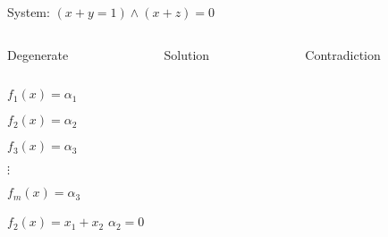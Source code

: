 \begin{frame}

    System: $(x + y = 1) \land (x + z) = 0$
	\begin{columns}
        \begin{column}{3cm}
            Degenerate
        \end{column}
        \begin{column}{3cm}
            Solution
    \end{column}
        \begin{column}{3cm}
            Contradiction
        \end{column}
    \end{columns}

    
    \begin{columns}
        \begin{column}{3cm}
            
        \end{column}
        \begin{column}{3cm}
            
        \end{column}
        \begin{column}{3cm}
            
        \end{column}
    \end{columns}

\end{frame}


\begin{frame}

    \begin{columns}
        \begin{column}{2.5cm}
            $f_1(x) = \alpha_1$

            $f_2(x) = \alpha_2$

            $f_3(x) = \alpha_3$

            $\vdots$

            $f_m(x) = \alpha_3$

            \vspace{1.5cm}

            $f_2(x) = x_1 + x_2$
            $\alpha_2 = 0$
        \end{column}
        \begin{column}{7cm}
            
	    \end{column}
    \end{columns}
\end{frame}
